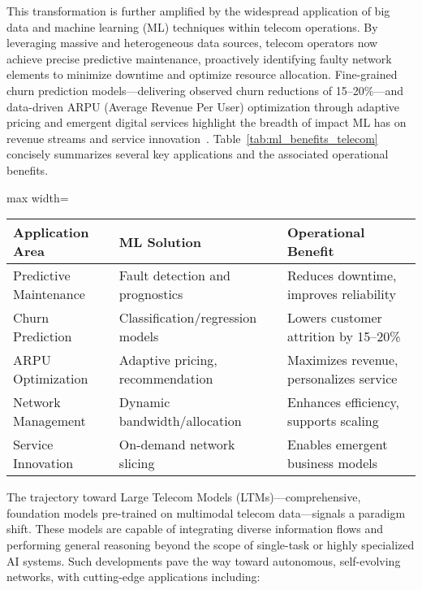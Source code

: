 \documentclass[sigconf]{acmart}
\begin{document}
This transformation is further amplified by the widespread application of big data and machine learning (ML) techniques within telecom operations. By leveraging massive and heterogeneous data sources, telecom operators now achieve precise predictive maintenance, proactively identifying faulty network elements to minimize downtime and optimize resource allocation. Fine-grained churn prediction models---delivering observed churn reductions of 15--20\%---and data-driven ARPU (Average Revenue Per User) optimization through adaptive pricing and emergent digital services highlight the breadth of impact ML has on revenue streams and service innovation~\cite{ref19,ref29}. Table~\ref{tab:ml_benefits_telecom} concisely summarizes several key applications and the associated operational benefits.

\begin{table*}[htbp]
\centering
\caption{Major Machine Learning Applications in Telecom Operations and Their Primary Benefits}
\label{tab:ml_benefits_telecom}
\begin{adjustbox}{max width=\textwidth}
\begin{tabular}{lll}
\toprule
\textbf{Application Area} & \textbf{ML Solution} & \textbf{Operational Benefit} \\
\midrule
Predictive Maintenance & Fault detection and prognostics & Reduces downtime, improves reliability \\
Churn Prediction & Classification/regression models & Lowers customer attrition by 15--20\% \\
ARPU Optimization & Adaptive pricing, recommendation & Maximizes revenue, personalizes service \\
Network Management & Dynamic bandwidth/allocation & Enhances efficiency, supports scaling \\
Service Innovation & On-demand network slicing & Enables emergent business models \\
\bottomrule
\end{tabular}
\end{adjustbox}
\end{table*}

The trajectory toward Large Telecom Models (LTMs)---comprehensive, foundation models pre-trained on multimodal telecom data---signals a paradigm shift. These models are capable of integrating diverse information flows and performing general reasoning beyond the scope of single-task or highly specialized AI systems. Such developments pave the way toward autonomous, self-evolving networks, with cutting-edge applications including:
\end{document}

